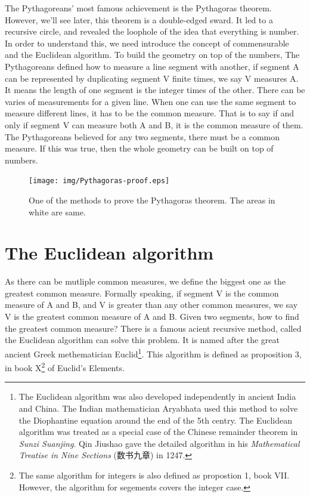 \documentclass{article}
\begin{document}
The Pythagoreans' most famous achievement is the Pythagoras theorem. However, we'll see later, this theorem is a double-edged sward. It led to a recursive circle, and revealed the loophole of the idea that everything is number. In order to understand this, we need introduce the concept of commensurable and the Euclidean algorithm. To build the geometry on top of the numbers, The Pythagoreans defined how to measure a line segment with another, if segment A can be represented by duplicating segment V finite times, we say V measures A. It means the length of one segment is the integer times of the other. There can be varies of measurements for a given line. When one can use the same segment to measure different lines, it has to be the common measure. That is to say if and only if segment V can measure both A and B, it is the common measure of them. The Pythagoreans believed for any two segments, there must be a common measure. If this was true, then the whole geometry can be built on top of numbers.

\begin{figure}[htbp]
 \centering
 \texttt{[image: img/Pythagoras-proof.eps]}
 \caption{One of the methods to prove the Pythagoras theorem. The areas in white are same.}
 \label{fig:Pythagoras-proof}
\end{figure}

\section{The Euclidean algorithm}

As there can be mutliple common measures, we define the biggest one as the greatest common measure. Formally speaking, if segment V is the common measure of A and B, and V is greater than any other common measures, we say V is the greatest common measure of A and B. Given two segments, how to find the greatest common measure? There is a famous acient recursive method, called the Euclidean algorithm can solve this problem. It is named after the great ancient Greek methematician Euclid\footnote{The Euclidean algorithm was also developed independently in ancient India and China. The Indian mathematician Aryabhata used this method to solve the Diophantine equation around the end of the 5th centry. The Euclidean algorithm was treated as a special case of the Chinese remainder theorem in {\em Sunzi Suanjing}. Qin Jiushao gave the detailed algorithm in his {\em Mathematical Treatise in Nine Sections} ({\fontspec{\cnmainft}数书九章}) in 1247.}. This algorithm is defined as proposition 3, in book X\footnote{The same algorithm for integers is also defined as propostion 1, book VII. However, the algorithm for segements covers the integer case.} of Euclid's Elements\cite{Elements}.
\end{document}
